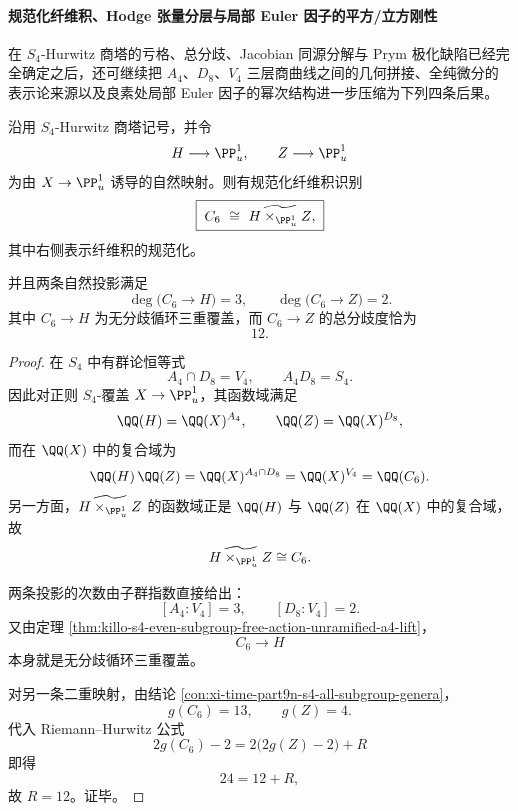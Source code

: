 \paragraph{规范化纤维积、Hodge 张量分层与局部 Euler 因子的平方/立方刚性}
在 \(S_4\)-Hurwitz 商塔的亏格、总分歧、Jacobian 同源分解与 Prym 极化缺陷已经完全确定之后，还可继续把 \(A_4\)、\(D_8\)、\(V_4\) 三层商曲线之间的几何拼接、全纯微分的表示论来源以及良素处局部 Euler 因子的幂次结构进一步压缩为下列四条后果。

\begin{conclusion}\label{con:xi-time-part9n-s4-c6-normalized-fiberproduct}
沿用 \(S_4\)-Hurwitz 商塔记号，并令
\[
H\longrightarrow \PP^1_u,\qquad Z\longrightarrow \PP^1_u
\]
为由 \(X\to \PP^1_u\) 诱导的自然映射。则有规范化纤维积识别
\[
\boxed{\;
C_6\ \cong\ \widetilde{H\times_{\PP^1_u} Z},
\;}
\]
其中右侧表示纤维积的规范化。

并且两条自然投影满足
\[
\deg\!\bigl(C_6\to H\bigr)=3,\qquad \deg\!\bigl(C_6\to Z\bigr)=2.
\]
其中 \(C_6\to H\) 为无分歧循环三重覆盖，而 \(C_6\to Z\) 的总分歧度恰为
\[
\boxed{\;12.\;}
\]
\end{conclusion}
\begin{proof}
在 \(S_4\) 中有群论恒等式
\[
A_4\cap D_8=V_4,\qquad A_4D_8=S_4.
\]
因此对正则 \(S_4\)-覆盖 \(X\to \PP^1_u\)，其函数域满足
\[
\QQ(H)=\QQ(X)^{A_4},\qquad
\QQ(Z)=\QQ(X)^{D_8},
\]
而在 \(\QQ(X)\) 中的复合域为
\[
\QQ(H)\,\QQ(Z)
=
\QQ(X)^{A_4\cap D_8}
=
\QQ(X)^{V_4}
=
\QQ(C_6).
\]
另一方面，\(\widetilde{H\times_{\PP^1_u} Z}\) 的函数域正是 \(\QQ(H)\) 与 \(\QQ(Z)\) 在 \(\QQ(X)\) 中的复合域，故
\[
\widetilde{H\times_{\PP^1_u} Z}\cong C_6.
\]

两条投影的次数由子群指数直接给出：
\[
[A_4:V_4]=3,\qquad [D_8:V_4]=2.
\]
又由定理 \ref{thm:killo-s4-even-subgroup-free-action-unramified-a4-lift}，
\[
C_6\to H
\]
本身就是无分歧循环三重覆盖。

对另一条二重映射，由结论 \ref{con:xi-time-part9n-s4-all-subgroup-genera}，
\[
g(C_6)=13,\qquad g(Z)=4.
\]
代入 Riemann--Hurwitz 公式
\[
2g(C_6)-2=2\bigl(2g(Z)-2\bigr)+R
\]
即得
\[
24=12+R,
\]
故 \(R=12\)。证毕。
\end{proof}

